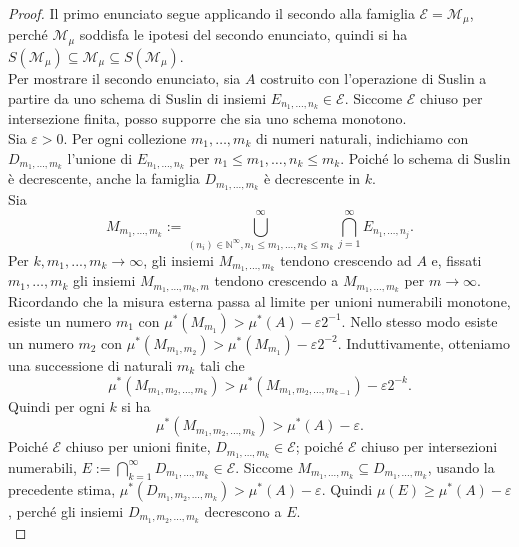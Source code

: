 \documentclass[a4paper, twoside,openright]{article}
\newcommand{\<}{\langle}
\renewcommand{\>}{\rangle}
\begin{document}
\begin{proof}
	Il primo enunciato segue applicando il secondo alla famiglia $\mathcal{E}=\mathcal{M}_{\mu}$, perché $\mathcal{M}_{\mu}$ soddisfa le ipotesi del secondo enunciato, quindi si ha $S(\mathcal{M}_{\mu}) \subseteq \mathcal{M}_{\mu} \subseteq S(\mathcal{M}_{\mu})$.\\
	Per mostrare il secondo enunciato, sia $A$ costruito con l'operazione di Suslin a partire da uno schema di Suslin di insiemi $E_{n_{1}, \ldots, n_{k}} \in \mathcal{E}$. Siccome $\mathcal{E}$ chiuso per intersezione finita, posso supporre che sia uno schema monotono.\\
	Sia $\varepsilon>0$. Per ogni collezione $m_{1}, \ldots, m_{k}$ di numeri naturali, indichiamo con $D_{m_{1}, \ldots, m_{k}}$ l'unione di $E_{n_{1}, \ldots, n_{k}}$ per $n_{1} \leq m_{1}, \ldots, n_{k} \leq m_{k}$. Poiché lo schema di Suslin è decrescente, anche la famiglia $D_{m_1,...,m_k}$ è decrescente in $k$.\\
	Sia
	$$
	M_{m_{1}, \ldots, m_{k}}:=\bigcup_{\left(n_{i}\right) \in \mathbb{N}^{\infty}, n_{1} \leq m_{1}, \ldots, n_{k} \leq m_{k}}^{\infty} \bigcap_{j=1}^{\infty} E_{n_{1}, \ldots, n_{j}} .
	$$
	Per $k, m_1,...,m_k \rightarrow \infty$, gli insiemi $M_{m_1,...,m_k}$ tendono crescendo ad $A$ e, fissati $m_{1}, \ldots, m_{k}$ gli insiemi $M_{m_{1}, \ldots, m_{k}, m}$  tendono crescendo a $M_{m_{1}, \ldots, m_{k}}$ per $m \rightarrow \infty$.\\
	Ricordando che la misura esterna passa al limite per unioni numerabili monotone, esiste un numero $m_{1}$ con $\mu^{*}\left(M_{m_{1}}\right)>\mu^{*}(A)-\varepsilon 2^{-1}$. Nello stesso modo esiste un numero $m_{2}$ con $\mu^{*}\left(M_{m_{1}, m_{2}}\right)>\mu^{*}\left(M_{m_{1}}\right)-\varepsilon 2^{-2}$. Induttivamente, otteniamo una successione di naturali $m_{k}$ tali che
	$$
	\mu^{*}\left(M_{m_{1}, m_{2}, \ldots, m_{k}}\right)>\mu^{*}\left(M_{m_{1}, m_{2}, \ldots, m_{k-1}}\right)-\varepsilon 2^{-k} .
	$$
	Quindi per ogni $k$ si ha
	$$
	\mu^{*}\left(M_{m_{1}, m_{2}, \ldots, m_{k}}\right)>\mu^{*}(A)-\varepsilon .
	$$
	Poiché $\mathcal{E}$ chiuso per unioni finite, $D_{m_{1}, \ldots, m_{k}} \in \mathcal{E}$; poiché $\mathcal{E}$ chiuso per intersezioni numerabili, $E:=\bigcap_{k=1}^{\infty} D_{m_{1}, \ldots, m_{k}} \in \mathcal{E}$. Siccome $M_{m_{1}, \ldots, m_{k}} \subseteq D_{m_{1}, \ldots, m_{k}}$, usando la precedente stima, $\mu^{*}\left(D_{m_{1}, m_{2}, \ldots, m_{k}}\right)>\mu^{*}(A)-\varepsilon$. Quindi $\mu(E) \geq \mu^{*}(A)-\varepsilon$, perché gli insiemi $D_{m_{1}, m_{2}, \ldots, m_{k}}$ decrescono a $E$.\\

\end{proof}
\end{document}
